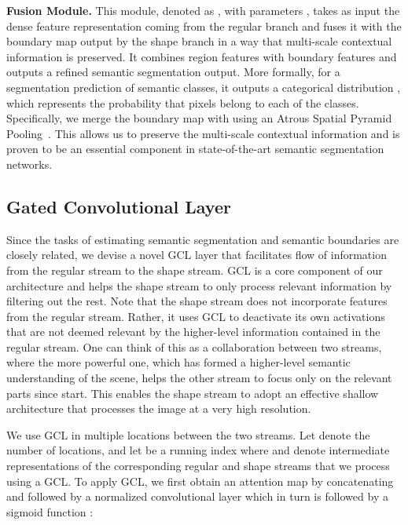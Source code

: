 \documentclass[10pt,twocolumn,letterpaper]{article}
\begin{document}
\vspace{1mm}
\noindent \textbf{Fusion Module.} This module, denoted as , with parameters , takes as input the dense feature representation  coming from the regular branch and fuses it with the boundary map  output by the shape branch in a way that multi-scale contextual information is preserved. It combines region features with boundary features and outputs a refined semantic segmentation output. More formally, for a segmentation prediction of  semantic classes, it outputs a categorical distribution , which represents the probability that pixels belong to each of the  classes.
Specifically, we  merge the boundary map  with  using an Atrous Spatial Pyramid Pooling~\cite{deeplabv3plus2018}. 
This allows us to preserve the multi-scale contextual information and is proven to be an essential component in state-of-the-art semantic segmentation networks.

\vspace{-2mm}
\subsection{Gated Convolutional Layer}
Since the tasks of estimating semantic segmentation and semantic boundaries are closely related, we devise a novel GCL layer that facilitates flow of information from the regular stream to the shape stream.
GCL is a core component of our architecture and helps the shape stream to only process relevant information by filtering out the rest. 
Note that the shape stream does not incorporate features from the regular stream. Rather, it uses GCL to deactivate its own activations that are not deemed relevant by the higher-level information contained in the regular stream. One can think of this as a collaboration between two streams, where the more powerful one, which has formed a higher-level semantic understanding of the scene, helps the other stream to focus only on the relevant parts since start. This enables the shape stream to adopt an effective shallow architecture that processes the image at a very high resolution.

We use GCL in multiple locations between the two streams.  Let  denote the number of locations, and 
let  be a running index where  and  denote intermediate representations of the corresponding regular and shape streams that we process using a GCL.
To apply GCL, we first obtain an attention map  by concatenating  and  followed by a normalized  convolutional layer  which in turn is followed by a sigmoid function  :
\vspace{-2mm}
\end{document}
